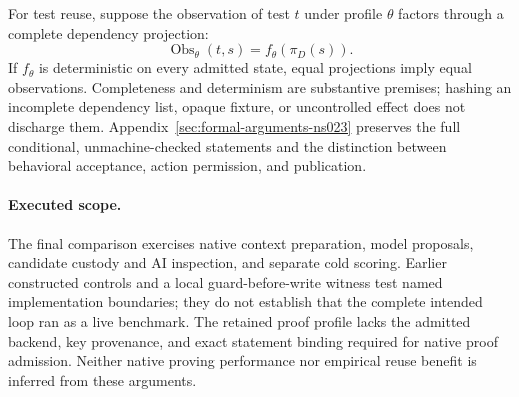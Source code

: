 For test reuse, suppose the observation of test $t$ under profile $\theta$
factors through a complete dependency projection:
\[
  \operatorname{Obs}_{\theta}(t,s)=f_{\theta}(\pi_D(s)).
\]
If $f_\theta$ is deterministic on every admitted state, equal projections imply
equal observations. Completeness and determinism are substantive premises;
hashing an incomplete dependency list, opaque fixture, or uncontrolled effect
does not discharge them. Appendix~\ref{sec:formal-arguments-ns023} preserves
the full conditional, unmachine-checked statements and the distinction between
behavioral acceptance, action permission, and publication.

\paragraph{Executed scope.}
The final comparison exercises native context preparation, model proposals,
candidate custody and AI inspection, and separate cold scoring. Earlier
constructed controls and a local guard-before-write witness test named
implementation boundaries; they do not establish that the complete intended
loop ran as a live benchmark. The retained proof profile lacks the admitted
backend, key provenance, and exact statement binding required for native proof
admission. Neither native proving performance nor empirical reuse benefit is
inferred from these arguments.

